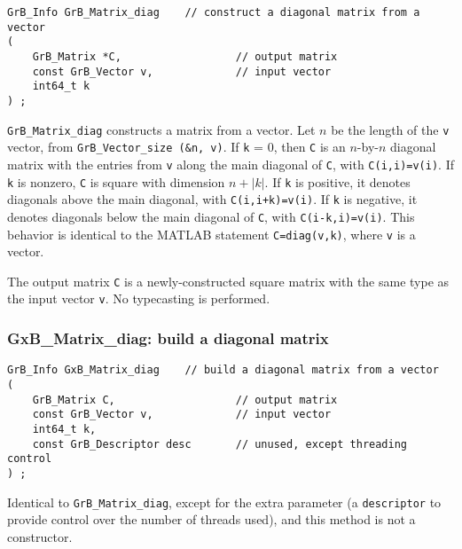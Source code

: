 \documentclass[12pt]{article}
\begin{document}
\begin{mdframed}[userdefinedwidth=6in]
{\footnotesize
\begin{verbatim}
GrB_Info GrB_Matrix_diag    // construct a diagonal matrix from a vector
(
    GrB_Matrix *C,                  // output matrix
    const GrB_Vector v,             // input vector
    int64_t k
) ;
\end{verbatim} } \end{mdframed}

\verb'GrB_Matrix_diag' constructs a matrix from a vector.  Let $n$ be the
length of the \verb'v' vector, from \verb'GrB_Vector_size (&n, v)'.  If
\verb'k' = 0, then \verb'C' is an $n$-by-$n$ diagonal matrix with the entries
from \verb'v' along the main diagonal of \verb'C', with \verb'C(i,i)=v(i)'.  If
\verb'k' is nonzero, \verb'C' is square with dimension $n+|k|$.  If \verb'k' is
positive, it denotes diagonals above the main diagonal, with
\verb'C(i,i+k)=v(i)'.
If \verb'k' is negative, it denotes diagonals below the main diagonal of
\verb'C', with \verb'C(i-k,i)=v(i)'.  This behavior is identical to the MATLAB
statement \verb'C=diag(v,k)', where \verb'v' is a vector.

The output matrix \verb'C' is a newly-constructed square matrix with the
same type as the input vector \verb'v'.  No typecasting is performed.

\subsubsection{{\sf GxB\_Matrix\_diag:} build a diagonal matrix}
\label{matrix_diag_GxB}

\begin{mdframed}[userdefinedwidth=6in]
{\footnotesize
\begin{verbatim}
GrB_Info GxB_Matrix_diag    // build a diagonal matrix from a vector
(
    GrB_Matrix C,                   // output matrix
    const GrB_Vector v,             // input vector
    int64_t k,
    const GrB_Descriptor desc       // unused, except threading control
) ;
\end{verbatim} } \end{mdframed}

Identical to \verb'GrB_Matrix_diag', except for the extra parameter
(a \verb'descriptor' to provide control over the number of threads used),
and this method is not a constructor.
\end{document}
